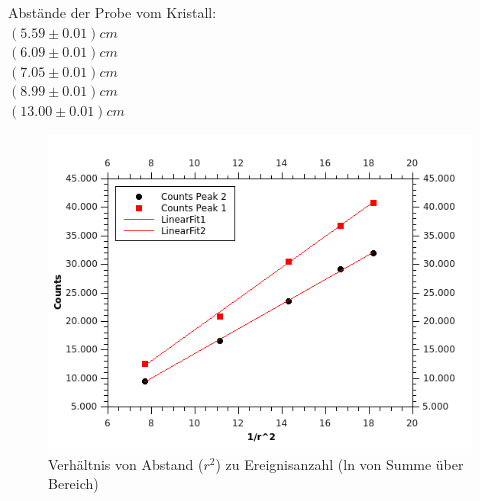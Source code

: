 \documentclass[12pt,a4paper]{article}
\begin{document}
\begin{multicols}{2}
\noindent Abstände der Probe vom Kristall:\\ 
$(5.59 \pm 0.01)cm$\\
$(6.09 \pm 0.01)cm$\\ 
$(7.05 \pm 0.01)cm$\\
$(8.99 \pm 0.01)cm$\\
$(13.00 \pm 0.01)cm$\\
\begin{figure}[H]
	\centering
	\includegraphics[scale=1.3]{./figures/Endergebniss_Abstand_mitFits.png}
	\caption{Verhältnis von Abstand ($r^2$) zu Ereignisanzahl (ln von Summe über Bereich)}
	\label{fig:abstandsgesetz_erg}
\end{figure}


\end{multicols}
\end{document}
